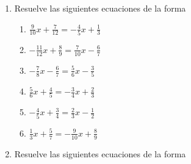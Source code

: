 \documentclass[12pt]{article}
\begin{document}
{\begin{enumerate}
  \begin{enumerate}
  \def\labelenumii{\roman{enumii}.}
  \item
    \(\frac{2}{3}x - \frac{5}{4} = \frac{7}{6}\)
  \item
    \(\frac{4}{5}x - \frac{2}{3} = -\frac{1}{6}\)
  \item
    \(\frac{11}{12}x + \frac{10}{11} = -\frac{9}{10}\)
  \item
    \(\frac{3}{4}x - \frac{4}{5} = -\frac{1}{2}\)
  \item
    \(\frac{6}{7}x + \frac{8}{9} = -\frac{10}{11}\)
  \item
    \(\frac{9}{10}x + \frac{1}{3} = -\frac{5}{6}\)
  \end{enumerate}
\item
  Resuelve las siguientes ecuaciones de la forma

  \begin{enumerate}
  \def\labelenumii{\roman{enumii}.}
  \setcounter{enumii}{2}
  \item
    \(\frac{9}{10}x + \frac{7}{12} = -\frac{4}{5}x + \frac{1}{3}\)
  \item
    \(-\frac{11}{12}x + \frac{8}{9} = \frac{7}{10}x - \frac{6}{7}\)
  \item
    \(-\frac{7}{8}x - \frac{6}{7} = \frac{5}{6}x - \frac{3}{5}\)
  \item
    \(\frac{5}{6}x + \frac{4}{5} = -\frac{3}{4}x + \frac{2}{3}\)
  \item
    \(-\frac{4}{5}x + \frac{3}{4} = \frac{2}{3}x - \frac{1}{2}\)
  \item
    \(\frac{1}{3}x + \frac{5}{7} = -\frac{9}{10}x + \frac{8}{9}\)
  \end{enumerate}
\item
  Resuelve las siguientes ecuaciones de la forma


\end{enumerate}}
\end{document}
